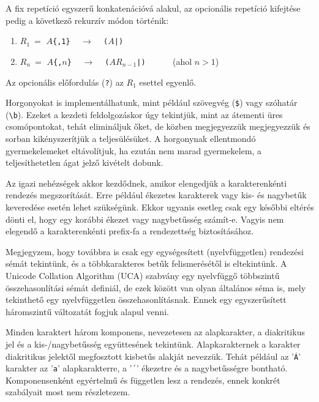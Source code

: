 \documentclass[
    parspace,
    noindent,
    nohyp,
]{elteiktdk}[2023/04/10]
\begin{document}
A fix repetíció egyszerű konkatenációvá alakul,
az opcionális repetíció kifejtése pedig a következő rekurzív módon történik:

\begin{enumerate}
    \item $R_1~=$ \texttt{$A$\{,1\}} ~ $\longrightarrow$ ~ \texttt{($A$|)}
    \item $R_n~=$ \texttt{$A$\{,$n$\}} ~ $\longrightarrow$ ~ \texttt{($AR_{n-1}$|)} ~~~~~ (ahol $n>1$)
\end{enumerate}

Az opcionális előfordulás (\texttt{?}) az $R_1$ esettel egyenlő.

Horgonyokat is implementálhatunk,
mint például szövegvég (\texttt{\$}) vagy szóhatár (\texttt{{\textbackslash}b}).
Ezeket a kezdeti feldolgozáskor úgy tekintjük,
mint az átementi üres csomópontokat, tehát elimináljuk őket,
de közben megjegyezzük megjegyezzük és sorban kikényszerítjük a teljesülésüket.
A horgonynak ellentmondó gyermekelemeket eltávolítjuk,
ha ezután nem marad gyermekelem, a teljesíthetetlen ágat jelző kivételt dobunk.


Az igazi nehézségek akkor kezdődnek,
amikor elengedjük a karakterenkénti rendezés megszorítását.
Erre például ékezetes karakterek vagy kis- és nagybetűk keveredése esetén lehet szükségünk.
Ekkor ugyanis esetleg csak egy későbbi eltérés dönti el,
hogy egy korábbi ékezet vagy nagybetűsség számít-e.
Vagyis nem elegendő a karakterenkénti prefix-fa a rendezettség biztosításához.

Megjegyzem, hogy továbbra is csak egy egységesített (nyelvfüggetlen) rendezési sémát tekintünk,
és a többkarakteres betűk felismerésétől is eltekintünk.
A Unicode Collation Algorithm (UCA) szabvány egy nyelvfüggő többszintű összehasonlítási sémát definiál,
de ezek között van olyan általános séma is, mely tekinthető egy nyelvfüggetlen összehasonlításnak.
Ennek egy egyszerűsített háromszintű változatát fogjuk alapul venni.

Minden karaktert három komponens,
nevezetesen az alapkarakter, a diakritikus jel és a kis-/nagybetűsség együttesének tekintünk.
Alapkarakternek a karakter diakritikus jelektől megfosztott kisbetűs alakját nevezzük.
Tehát például az '\texttt{Á}' karakter az '\texttt{a}' alapkarakterre,
a '\texttt{´}' ékezetre és a nagybetűsségre bontható.
Komponensenként egyértelmű és független lesz a rendezés,
ennek konkrét szabályait most nem részletezem.
\end{document}
